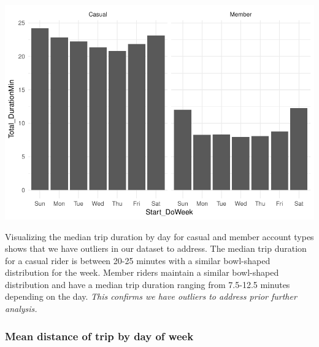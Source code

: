\documentclass[]{article}
\newenvironment{Shaded}{\begin{snugshade}}{\end{snugshade}}
\newcommand{\KeywordTok}[1]{\textcolor[rgb]{0.13,0.29,0.53}{\textbf{#1}}}
\newcommand{\DataTypeTok}[1]{\textcolor[rgb]{0.13,0.29,0.53}{#1}}
\newcommand{\StringTok}[1]{\textcolor[rgb]{0.31,0.60,0.02}{#1}}
\newcommand{\OperatorTok}[1]{\textcolor[rgb]{0.81,0.36,0.00}{\textbf{#1}}}
\newcommand{\NormalTok}[1]{#1}
\begin{document}
\begin{Shaded}
\end{Shaded}

\includegraphics{Nice_Ride_Project_Stat_ReportDRAFT_files/figure-latex/unnamed-chunk-8-1.pdf}

Visualizing the median trip duration by day for casual and member
account types shows that we have outliers in our dataset to address. The
median trip duration for a casual rider is between 20-25 minutes with a
similar bowl-shaped distribution for the week. Member riders maintain a
similar bowl-shaped distribution and have a median trip duration ranging
from 7.5-12.5 minutes depending on the day. \emph{This confirms we have
outliers to address prior further analysis.}

\subsubsection{Mean distance of trip by day of
week}\label{mean-distance-of-trip-by-day-of-week}
\end{document}
